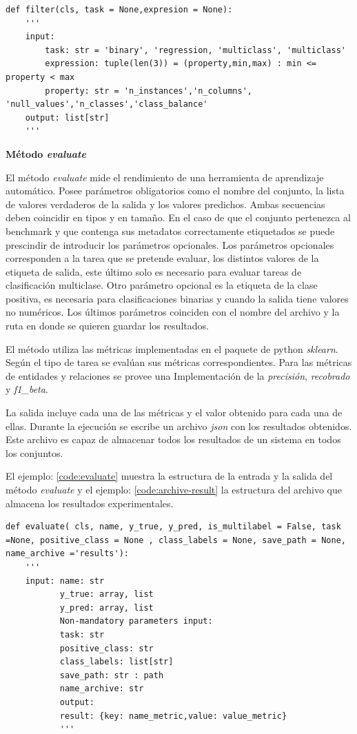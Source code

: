 \begin{lstlisting}[caption=Método filter, label= code:filter]
def filter(cls, task = None,expresion = None):
    '''
    input:
        task: str = 'binary', 'regression, 'multiclass', 'multiclass'
        expression: tuple(len(3)) = (property,min,max) : min <= property < max
        property: str = 'n_instances','n_columns', 'null_values','n_classes','class_balance'
    output: list[str]
    '''  
\end{lstlisting}

\begin{flushleft} 
    { \textbf{Método \textit{evaluate}}}\label{method:mevaluate}
\end{flushleft}
El método \textit{evaluate} mide el rendimiento de una herramienta de aprendizaje automático. 
Posee parámetros obligatorios como el nombre del conjunto, la lista de valores verdaderos de la salida y los valores predichos.
Ambas secuencias deben coincidir en tipos y en tamaño. En el caso de que el conjunto pertenezca al benchmark y que contenga sus metadatos 
correctamente etiquetados se puede prescindir de introducir los parámetros opcionales. 
Los parámetros opcionales corresponden a la tarea que se pretende evaluar, los distintos valores de la etiqueta de salida, este último solo es necesario para evaluar 
tareas de clasificación multiclase. Otro parámetro opcional es la etiqueta de la clase positiva, es necesaria para clasificaciones binarias y cuando la salida tiene 
valores no numéricos. 
Los últimos parámetros coinciden con el nombre del archivo y la ruta en donde se quieren guardar los resultados. 

El método utiliza las métricas implementadas en el paquete de python \textit{sklearn}. Según el tipo de tarea se evalúan sus métricas correspondientes.
Para las métricas de entidades y relaciones se provee una Implementación de la \textit{precisión}, \textit{recobrado} y \textit{f1\_beta}. 

La salida incluye cada una de las métricas y el valor obtenido para cada una de ellas. Durante la ejecución se escribe un archivo \textit{json} con los resultados 
obtenidos. Este archivo es capaz de almacenar todos los resultados de un sistema en todos los conjuntos.

El ejemplo: \ref{code:evaluate} muestra la estructura de la entrada y la salida del método \textit{evaluate} y el ejemplo: \ref{code:archive-result} la estructura 
del archivo que almacena los resultados experimentales.


\begin{lstlisting}[caption=Método evaluate, label= code:evaluate]
    def evaluate( cls, name, y_true, y_pred, is_multilabel = False, task =None, positive_class = None , class_labels = None, save_path = None, name_archive ='results'):
    '''
    input: name: str
           y_true: array, list
           y_pred: array, list
           Non-mandatory parameters input:
           task: str
           positive_class: str
           class_labels: list[str]
           save_path: str : path
           name_archive: str
           output: 
           result: {key: name_metric,value: value_metric}
           '''
        \end{lstlisting}
        
